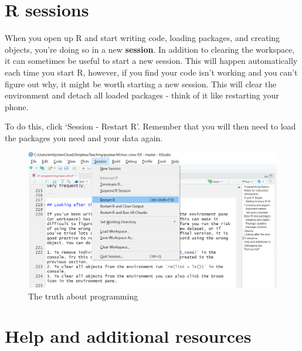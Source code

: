 \documentclass[]{book}
\begin{document}
\hypertarget{r-sessions}{%
\section{R sessions}\label{r-sessions}}

When you open up R and start writing code, loading packages, and creating objects, you're doing so in a new \textbf{session}. In addition to clearing the workspace, it can sometimes be useful to start a new session. This will happen automatically each time you start R, however, if you find your code isn't working and you can't figure out why, it might be worth starting a new session. This will clear the environment and detach all loaded packages - think of it like restarting your phone.

To do this, click `Session - Restart R'. Remember that you will then need to load the packages you need and your data again.

\begin{figure}

{\centering \includegraphics[width=1\linewidth]{images/new_session} 

}

\caption{The truth about programming}\label{fig:img-session}
\end{figure}

\hypertarget{help-and-additional-resources}{%
\section{Help and additional resources}\label{help-and-additional-resources}}
\end{document}
